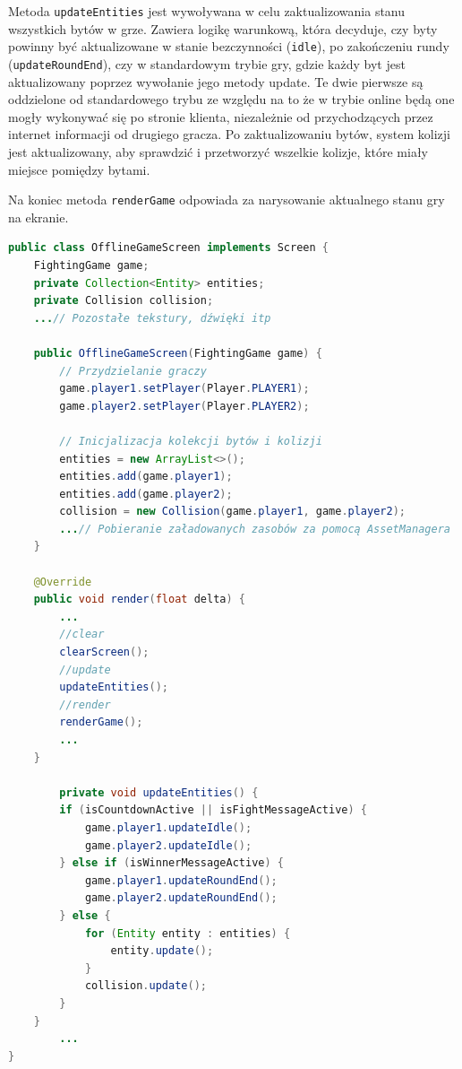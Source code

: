 Metoda \texttt{updateEntities} jest wywoływana w celu zaktualizowania stanu wszystkich bytów w grze. Zawiera logikę warunkową, która decyduje, czy byty powinny być aktualizowane w stanie bezczynności (\texttt{idle}), po zakończeniu rundy (\texttt{updateRoundEnd}), czy w standardowym trybie gry, gdzie każdy byt jest aktualizowany poprzez wywołanie jego metody update. Te dwie pierwsze są oddzielone od standardowego trybu ze względu na to że w trybie online będą one mogły wykonywać się po stronie klienta, niezależnie od przychodzących przez internet informacji od drugiego gracza. Po zaktualizowaniu bytów, system kolizji jest aktualizowany, aby sprawdzić i przetworzyć wszelkie kolizje, które miały miejsce pomiędzy bytami. 

Na koniec metoda \texttt{renderGame} odpowiada za narysowanie aktualnego stanu gry na ekranie.

\begin{lstlisting}[language=Java,style=JavaStyle,label=list:offline_game,caption=Klasa \texttt{OfflineGameScreen},
                   basicstyle=\footnotesize\ttfamily]
public class OfflineGameScreen implements Screen {
    FightingGame game;
    private Collection<Entity> entities;
    private Collision collision;
    ...// Pozostałe tekstury, dźwięki itp

    public OfflineGameScreen(FightingGame game) {
        // Przydzielanie graczy
        game.player1.setPlayer(Player.PLAYER1);
        game.player2.setPlayer(Player.PLAYER2);

        // Inicjalizacja kolekcji bytów i kolizji
        entities = new ArrayList<>();
        entities.add(game.player1);
        entities.add(game.player2);
        collision = new Collision(game.player1, game.player2); 
        ...// Pobieranie załadowanych zasobów za pomocą AssetManagera
    }

    @Override
    public void render(float delta) {
        ...
        //clear
        clearScreen();
        //update
        updateEntities();
        //render
        renderGame();
		...
    }
		
		private void updateEntities() {
        if (isCountdownActive || isFightMessageActive) {
            game.player1.updateIdle();
            game.player2.updateIdle();
        } else if (isWinnerMessageActive) {
            game.player1.updateRoundEnd();
            game.player2.updateRoundEnd();
        } else {
            for (Entity entity : entities) {
                entity.update();
            }
            collision.update();
        }
    }
		...
}
\end{lstlisting}

